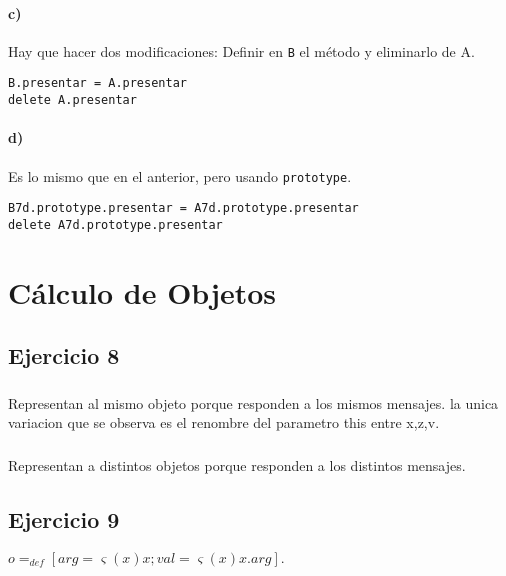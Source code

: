 \documentclass[10pt,a4paper]{article}
\begin{document}
\paragraph{c)} Hay que hacer dos modificaciones: Definir en \texttt{B} el método y eliminarlo de A.
\begin{centrado}
\begin{verbatim}
B.presentar = A.presentar
delete A.presentar
\end{verbatim}
\end{centrado}

\paragraph{d)} Es lo mismo que en el anterior, pero usando \texttt{prototype}.
\begin{centrado}
\begin{verbatim}
B7d.prototype.presentar = A7d.prototype.presentar
delete A7d.prototype.presentar
\end{verbatim}
\end{centrado}

\section*{Cálculo de Objetos}

\subsection{Ejercicio 8}
\subsubsection{}
Representan al mismo objeto porque responden a los mismos mensajes. la unica variacion que se observa es el renombre del parametro this entre x,z,v.
\subsubsection{}
Representan a distintos objetos porque responden a los distintos mensajes.
\subsection{Ejercicio 9}
$o =_{def} [arg = \varsigma(x)x; val = \varsigma(x)x.arg].$
\end{document}
